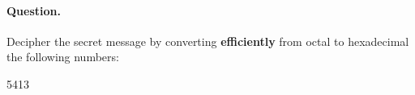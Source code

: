 \paragraph{Question.} Decipher the secret message by converting
  \textbf{efficiently} from octal to hexadecimal the following
  numbers:
\begin{center}
5413    
\end{center}
